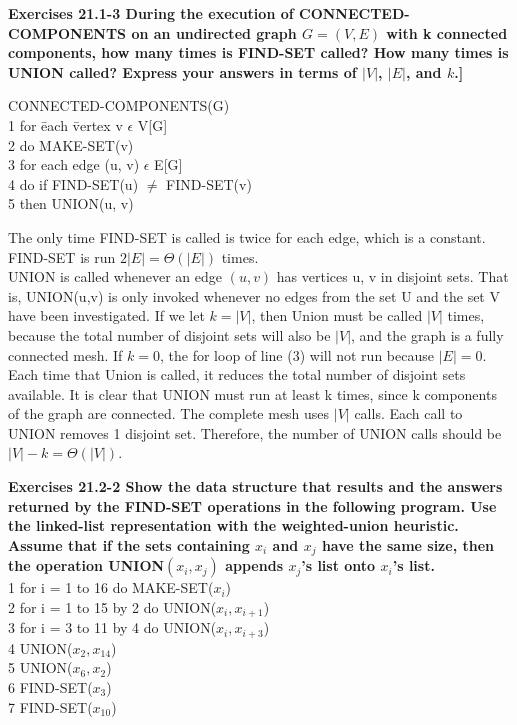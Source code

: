 \documentclass[10pt,fullpage]{article}
\begin{document}
\newpage

\textbf{Exercises 21.1-3 During the execution of
CONNECTED-COMPONENTS on an undirected graph $G = (V, E)$ with k
connected components, how many times is FIND-SET called? How many
times is UNION called? Express your answers in terms of $|V|$,
$|E|$, and $k$.]}

\begin{tabbing}
CONNECTED-COMPONENTS(G)\\
1 for \= each \= vertex v $\epsilon$ V[G]\\
2 \> do MAKE-SET(v)\\
3 for each edge (u, v) $\epsilon$ E[G]\\
4 \> do if FIND-SET(u) $\neq$ FIND-SET(v)\\
5 \> \> then UNION(u, v)\\
\end{tabbing}

The only time FIND-SET is called is twice for each edge, which is a
constant. FIND-SET is run $2|E| = \Theta(|E|)$ times.\\

UNION is called whenever an edge $(u,v)$ has vertices u, v in
disjoint sets. That is, UNION(u,v) is only invoked whenever no edges
from the set U and the set V have been investigated. If we let $k =
|V|$, then Union must be called $|V|$ times, because the total
number of disjoint sets will also be $|V|$, and the graph is a fully
connected mesh. If $k = 0$, the for loop of line (3) will not run
because $|E| = 0$.\\

Each time that Union is called, it reduces the total number of
disjoint sets available. It is clear that UNION must run at least k
times, since k components of the graph are connected. The complete
mesh uses $|V|$ calls. Each call to UNION removes 1 disjoint set.
Therefore, the number of UNION calls should be $|V| - k =
\Theta(|V|)$.

\newpage

\textbf{Exercises 21.2-2  Show the data structure that results and
the answers returned by the FIND-SET operations in the following
program. Use the linked-list representation with the weighted-union
heuristic. Assume that if the sets containing $x_i$ and $x_j$ have
the same size, then the operation UNION$(x_i, x_j)$ appends $x_j$'s
list onto $x_i$'s list.}\\
 1  for i = 1 to 16      do MAKE-SET($x_i$)\\
 2  for i = 1 to 15 by 2 do UNION($x_i, x_{i+1}$)\\
 3  for i = 3 to 11 by 4 do UNION($x_i, x_{i+3}$)\\
 4  UNION($x_2, x_{14}$)\\
 5  UNION($x_6, x_2$)\\
 6  FIND-SET($x_3$)\\
 7  FIND-SET($x_{10}$)\\\\
\end{document}
